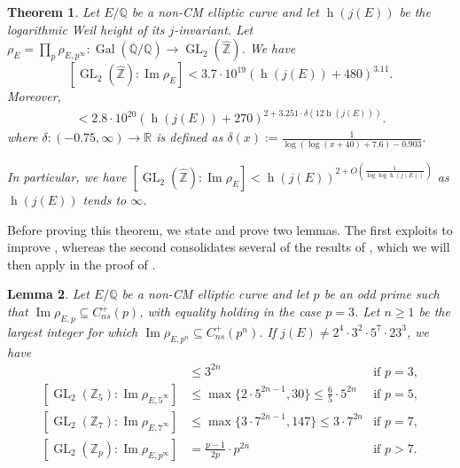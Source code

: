 \documentclass{amsart}
\newtheorem{theorem}{Theorem}
\newtheorem{lemma}[theorem]{Lemma}
\theoremstyle{definition}
\newcommand{\Z}{\mathbb{Z}}
\newcommand{\Q}{\mathbb{Q}}
\newcommand{\Gal}{\operatorname{Gal}}
\newcommand{\GL}{\operatorname{GL}}
\numberwithin{theorem}{section}
\numberwithin{equation}{section}
\begin{document}
\begin{theorem}\label{thm: adelic bound}
    Let $E/\Q$ be a non-CM elliptic curve and let $\operatorname{h}(j(E))$ be the logarithmic Weil height of its $j$-invariant. Let $\rho_E=\prod_p \rho_{E,p^\infty} : \Gal(\overline{\Q}/\Q) \rightarrow \GL_2(\widehat{\Z})$. We have
    \[
    [\GL_2(\widehat{\Z}) : \operatorname{Im} \rho_E] < 3.7 \cdot 10^{19} (\operatorname{h}(j(E)) + 480)^{3.11}.
    \]
    Moreover, 
    \begin{align*}
		[\GL_2(\widehat{\Z}) : \operatorname{Im}\rho_E] < 2.8 \cdot 10^{20} (\operatorname{h}(j(E)) + 270)^{2 + 3.251 \cdot \delta(12 \operatorname{h}(j(E)))}.
    \end{align*}
    where $\delta: (-0.75,\infty) \rightarrow \mathbb{R}$ is defined as 
		$\delta(x) := \frac{1}{\log(\log(x+40) + 7.6) - 0.903}.$

    In particular, we have $[\GL_2(\widehat{\Z}) : \operatorname{Im}\rho_E] < \operatorname{h}(j(E))^{2+O\left(\frac{1}{\log\log\operatorname{h}(j(E))}\right)}$ as $\operatorname{h}(j(E))$ tends to $\infty$.
\end{theorem}

Before proving this theorem, we state and prove two lemmas. The first exploits  to improve \cite[Corollary 6.8]{furio24}, whereas the second consolidates several of the results of \cite{furio24}, which we will then apply in the proof of .

\begin{lemma}\label{lemma: p-adic indices}
    Let $E/\Q$ be a non-CM elliptic curve and let $p$ be an odd prime such that $\operatorname{Im}\rho_{E,p} \subseteq C_{ns}^+(p)$, with equality holding in the case $p=3$. Let $n \ge 1$ be the largest integer for which $\operatorname{Im}\rho_{E,p^n} \subseteq C_{ns}^+(p^n)$. If $j(E) \ne 2^{4} \cdot 3^{2} \cdot 5^{7} \cdot 23^{3}$, we have
	\begin{align*}
        [\GL_2(\Z_3) : \operatorname{Im}\rho_{E,3^\infty}] &\le 3^{2n} &\text{if } p=3, \\
        [\GL_2(\Z_5) : \operatorname{Im}\rho_{E,5^\infty}] &\le \max\{2 \cdot 5^{2n-1}, 30\} \le \frac{6}{5} \cdot 5^{2n} &\text{if } p=5,\\
        [\GL_2(\Z_7) : \operatorname{Im}\rho_{E,7^\infty}] &\le \max\{3 \cdot 7^{2n-1}, 147\} \le 3 \cdot 7^{2n} &\text{if } p=7, \\
        [\GL_2(\Z_p) : \operatorname{Im}\rho_{E,p^\infty}] &= \frac{p-1}{2p} \cdot p^{2n} &\text{if } p > 7.
	\end{align*}
\end{lemma}
\end{document}
